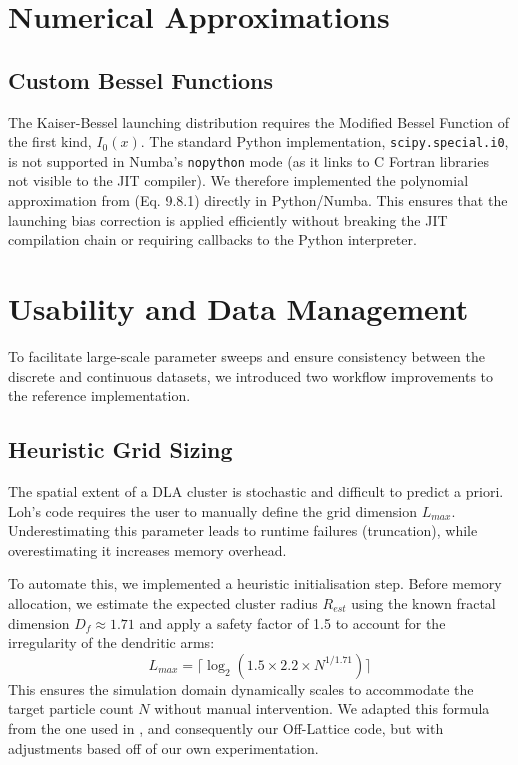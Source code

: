 \documentclass[12pt, a4paper, oneside]{report}
\theoremstyle{remark}
\begin{document}
\begin{algorithm}[H]
\caption{Alias Sampling (Constant Time)}
\end{algorithm}

\section{Numerical Approximations}
\subsection{Custom Bessel Functions}
The Kaiser-Bessel launching distribution requires the Modified Bessel Function of the first kind, $I_0(x)$.
The standard Python implementation, \texttt{scipy.special.i0}, is not supported in Numba's \texttt{nopython} mode (as it links to C Fortran libraries not visible to the JIT compiler).
We therefore implemented the polynomial approximation from \citet{Abramowitz1965} (Eq. 9.8.1) directly in Python/Numba. This ensures that the launching bias correction is applied efficiently without breaking the JIT compilation chain or requiring callbacks to the Python interpreter.

\section{Usability and Data Management}
\label{app:usability}

To facilitate large-scale parameter sweeps and ensure consistency between the discrete and continuous datasets, we introduced two workflow improvements to the reference implementation.

\subsection{Heuristic Grid Sizing}
The spatial extent of a DLA cluster is stochastic and difficult to predict a priori. Loh's code requires the user to manually define the grid dimension $L_{max}$. Underestimating this parameter leads to runtime failures (truncation), while overestimating it increases memory overhead.

To automate this, we implemented a heuristic initialisation step. Before memory allocation, we estimate the expected cluster radius $R_{est}$ using the known fractal dimension $D_f \approx 1.71$ and apply a safety factor of 1.5 to account for the irregularity of the dendritic arms:
\begin{equation}
    L_{max} = \lceil \log_2(1.5 \times 2.2 \times N^{1/1.71}) \rceil
\end{equation}
This ensures the simulation domain dynamically scales to accommodate the target particle count $N$ without manual intervention. We adapted this formula from the one used in \cite{Bell2019}, and consequently our Off-Lattice code, but with adjustments based off of our own experimentation.
\end{document}
